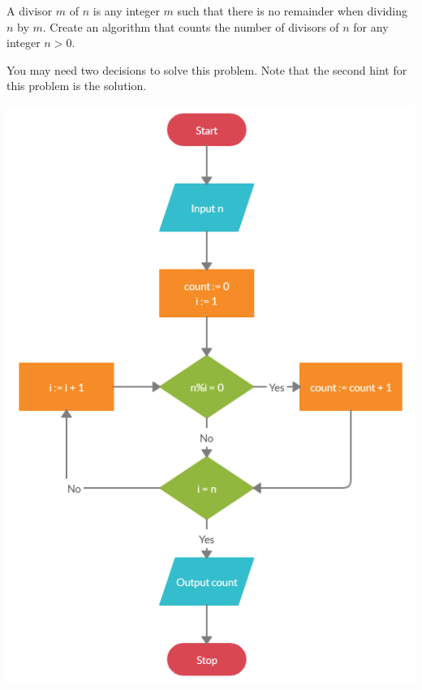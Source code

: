 \documentclass{ximera}
\begin{document}
\begin{question}
	A divisor $m$ of $n$ is any integer $m$ such that there is no remainder when dividing $n$ by $m$. Create an algorithm that counts the number of divisors of $n$ for any integer $n>0$. 
	\begin{hint}
	You may need two decisions to solve this problem. Note that the second hint for this problem is the solution.
	\end{hint}

	\begin{hint}
	\begin{center}
		\includegraphics{divcount.png}
	\end{center}
	\end{hint}
\end{question}
\end{document}
